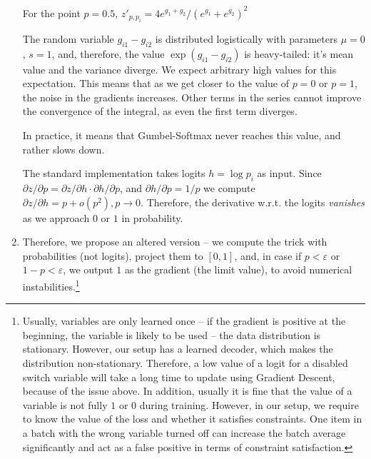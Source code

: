 \documentclass[a4paper,11pt,oneside]{report}
\begin{document}
\begin{enumerate}
    For the point $p=0.5$, $z'_{p,p_i}=4e^{g_1+g_2}/(e^{g_1}+e^{g_2})^2$

    The random variable $g_{i1}-g_{i2}$ is distributed logistically with parameters $\mu=0$, $s=1$, and, therefore, the value $\exp(g_{i1}-g_{i2})$ is heavy-tailed: it's mean value and the variance diverge. We expect arbitrary high values for this expectation. This means that as we get closer to the value of $p=0$ or $p=1$, the noise in the gradients increases. Other terms in the series cannot improve the convergence of the integral, as even the first term diverges.

    In practice, it means that Gumbel-Softmax never reaches this value, and rather slows down.






    The standard implementation takes logits $h=\log p_i$ as input. Since $\partial z/\partial p=\partial z/\partial h\cdot \partial h/\partial p$, and $\partial h/\partial p=1/p$ we compute $\partial z/\partial h=p+o(p^2),p\to 0$. Therefore, the derivative w.r.t. the logits {\em vanishes} as we approach $0$ or $1$ in probability.

    \item Therefore, we propose an altered version -- we compute the trick with probabilities (not logits), project them to $[0,1]$, and, in case if $p<\varepsilon$ or $1-p<\varepsilon$, we output $1$ as the gradient (the limit value), to avoid numerical instabilities.\footnote{Usually, variables are only learned once -- if the gradient is positive at the beginning, the variable is likely to be used -- the data distribution is stationary. However, our setup has a learned decoder, which makes the distribution non-stationary. Therefore, a low value of a logit for a disabled switch variable will take a long time to update using Gradient Descent, because of the issue above. In addition, usually it is fine that the value of a variable is not fully $1$ or $0$ during training. However, in our setup, we require to know the value of the loss and whether it satisfies constraints. One item in a batch with the wrong variable turned off can increase the batch average significantly and act as a false positive in terms of constraint satisfaction.}



\end{enumerate}
\end{document}
